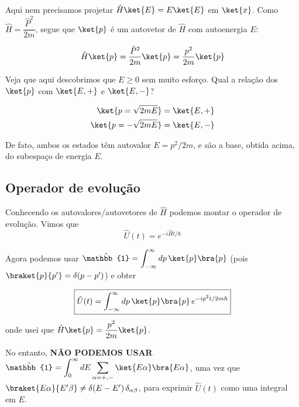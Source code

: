 Aqui nem precisamos projetar $\hat{H}\ket{E} = E\ket{E}$ em $\ket{x}$. Como $\hat{H} = \dfrac{\hat{P}^2}{2m}$, segue que $\ket{p}$ é um autovetor de $\hat{H}$ com autoenergia $E$:

\begin{equation}
    \hat{H}\ket{p} = \frac{\hat{P}^2}{2m}\ket{p} = \frac{p^2}{2m}\ket{p}
\label{eq:aula14_H_ket_p}
\end{equation}

Veja que aqui descobrimos que $E \geq 0$ sem muito esforço. Qual a relação dos $\ket{p}$ com $\ket{E,+}$ e $\ket{E,-}$?

\begin{align}
    \ket{p = \sqrt{2mE}} &= \ket{E,+} \label{eq:aula14_p_E_mais} \\
    \ket{p = -\sqrt{2mE}} &= \ket{E,-} \label{eq:aula14_p_E_menos}
\end{align}


De fato, ambos os estados têm autovalor $E = p^2/2m$, e são a base, obtida acima, do subespaço de energia $E$.

\subsection*{Operador de evolução}

Conhecendo os autovalores/autovetores de $\hat{H}$ podemos montar o operador de evolução. Vimos que
\begin{equation}
    \hat{U}(t) = e^{-i\hat{H}t/\hbar}
\label{eq:aula14_U_def}
\end{equation}

Agora podemos usar $\hat{\mathbb{1}} = \displaystyle\int_{-\infty}^{\infty} dp\, \ket{p}\bra{p}$ (pois $\braket{p}{p'} = \delta(p-p')$) e obter

\begin{equation}
    \boxed{\hat{U}(t) = \int_{-\infty}^{\infty} dp\, \ket{p}\bra{p}\, e^{-ip^2t/2m\hbar}}
\label{eq:aula14_U_p}
\end{equation}
onde usei que $\hat{H}\ket{p} = \dfrac{p^2}{2m}\ket{p}$.

No entanto, \textbf{NÃO PODEMOS USAR} $\hat{\mathbb{1}} = \displaystyle\int_0^{\infty} dE \sum_{\alpha = +,-} \ket{E\alpha}\bra{E\alpha}$, uma vez que $\braket{E\alpha}{E'\beta} \neq \delta(E-E')\,\delta_{\alpha\beta}$, para exprimir $\hat{U}(t)$ como uma integral em $E$.

